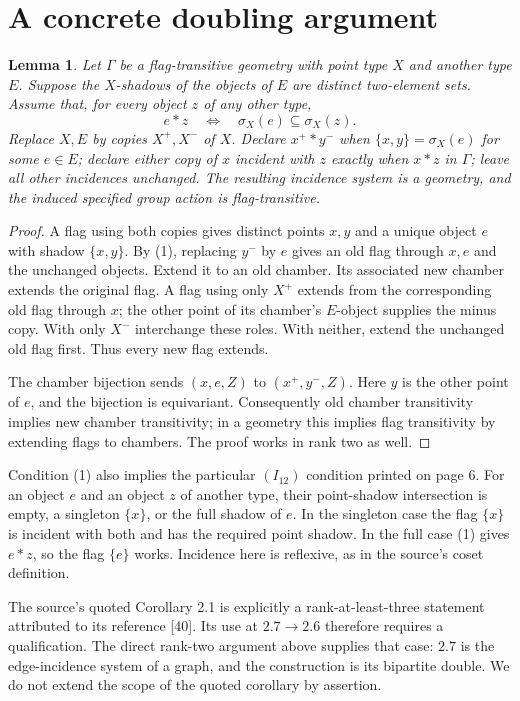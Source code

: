 \documentclass[11pt]{article}
\newtheorem{lemma}{Lemma}\newtheorem{theorem}{Theorem}
\begin{document}
\section{A concrete doubling argument}
\begin{lemma}
Let $\Gamma$ be a flag-transitive geometry with point type $X$ and
another type $E$. Suppose the $X$-shadows of the objects of $E$ are
distinct two-element sets. Assume that, for every object $z$ of any
other type,
\[
       e*z\quad\Longleftrightarrow\quad \sigma_X(e)\subseteq\sigma_X(z).
       \tag{1}
\]
Replace $X,E$ by copies $X^+,X^-$ of $X$. Declare $x^+*y^-$ when
$\{x,y\}=\sigma_X(e)$ for some $e\in E$; declare either copy of $x$
incident with $z$ exactly when $x*z$ in $\Gamma$; leave all other
incidences unchanged. The resulting incidence system is a geometry,
and the induced specified group action is flag-transitive.
\end{lemma}
\begin{proof}
A flag using both copies gives distinct points $x,y$ and a unique
object $e$ with shadow $\{x,y\}$. By (1), replacing $y^-$ by $e$
gives an old flag through $x,e$ and the unchanged objects. Extend it
to an old chamber. Its associated new chamber extends the original
flag. A flag using only $X^+$ extends from the corresponding old flag
through $x$; the other point of its chamber's $E$-object supplies the
minus copy. With only $X^-$ interchange these roles. With neither,
extend the unchanged old flag first. Thus every new flag extends.

The chamber bijection sends $(x,e,Z)$ to $(x^+,y^-,Z)$.
Here $y$ is the other point of $e$, and the bijection is equivariant.
Consequently old chamber transitivity implies new chamber transitivity;
in a geometry this implies flag transitivity by extending flags to
chambers. The proof works in rank two as well.
\end{proof}
Condition (1) also implies the particular $(I_{12})$ condition printed
on page 6. For an object $e$ and an object $z$ of another type, their
point-shadow intersection is empty, a singleton $\{x\}$, or the full
shadow of $e$. In the singleton case the flag $\{x\}$ is incident
with both and has the required point shadow. In the full case (1)
gives $e*z$, so the flag $\{e\}$ works. Incidence here is reflexive,
as in the source's coset definition.

The source's quoted Corollary 2.1 is explicitly a rank-at-least-three
statement attributed to its reference [40]. Its use at $2.7\to2.6$
therefore requires a qualification. The direct rank-two argument above
supplies that case: $2.7$ is the edge-incidence system of a graph, and
the construction is its bipartite double. We do not extend the scope of
the quoted corollary by assertion.
\end{document}
